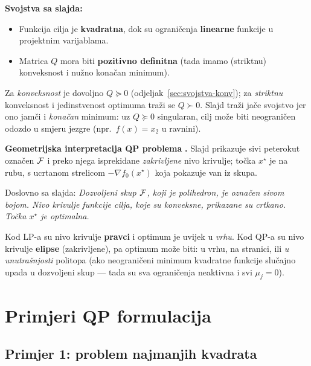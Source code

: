 \textbf{Svojstva sa slajda:}
\begin{itemize}
  \item Funkcija cilja je \textbf{kvadratna}, dok su ograničenja
        \textbf{linearne} funkcije u projektnim varijablama.
  \item Matrica $Q$ mora biti \textbf{pozitivno definitna} (tada imamo
        (striktnu) konveksnost i nužno konačan minimum).
\end{itemize}

\begin{napomena}
Za \emph{konveksnost} je dovoljno $Q \succeq 0$
(odjeljak~\ref{sec:svojstva-konv}); za \emph{striktnu} konveksnost i
jedinstvenost optimuma traži se $Q \succ 0$. Slajd traži jače svojstvo jer ono
jamči i \emph{konačan} minimum: uz $Q \succeq 0$ singularan, cilj može biti
neograničen odozdo u smjeru jezgre (npr.\ $f(x) = x_2$ u ravnini).
\end{napomena}

\textbf{Geometrijska interpretacija QP problema} \textbf{.} Slajd
prikazuje sivi peterokut označen $\mathcal{F}$ i preko njega isprekidane
\emph{zakrivljene} nivo krivulje; točka $x^\star$ je na rubu, s ucrtanom
strelicom $-\nabla f_0(x^\star)$ koja pokazuje van iz skupa.

Doslovno sa slajda: \emph{Dozvoljeni skup $\mathcal{F}$, koji je polihedron, je
označen sivom bojom. Nivo krivulje funkcije cilja, koje su konveksne, prikazane
su crtkano. Točka $x^\star$ je optimalna.}

\begin{napomena}
Kod LP-a su nivo krivulje \textbf{pravci} i optimum je uvijek u \emph{vrhu}.
Kod QP-a su nivo krivulje \textbf{elipse} (zakrivljene), pa optimum može biti:
u vrhu, na stranici, ili \emph{u unutrašnjosti} politopa (ako neograničeni
minimum kvadratne funkcije slučajno upada u dozvoljeni skup --- tada su sva
ograničenja neaktivna i svi $\mu_j = 0$).
\end{napomena}

\section{Primjeri QP formulacija}

\subsection{Primjer 1: problem najmanjih kvadrata}
\label{sec:najmanji-kvadrati}

